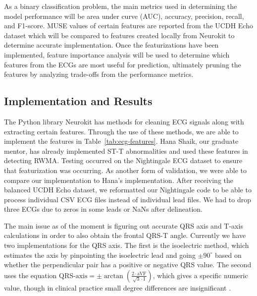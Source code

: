 \documentclass[sigconf,nonacm]{acmart}
\begin{document}
As a binary classification problem, the main metrics used in determining the model performance will be area under curve (AUC), accuracy, precision, recall, and F1-score. MUSE values of certain features are reported from the UCDH Echo dataset which will be compared to features created locally from Neurokit to determine accurate implementation. Once the featurizations have been implemented, feature importance analysis will be used to determine which features from the ECGs are most useful for prediction, ultimately pruning the features by analyzing trade-offs from the performance metrics.

\subsection{Implementation and Results}

The Python library Neurokit has methods for cleaning ECG signals along with extracting certain features. Through the use of these methods, we are able to implement the features in Table~\ref{tab:ecg-features}. Hana Shaik, our graduate mentor, has already implemented ST-T abnormalities and used these features in detecting RWMA. Testing occurred on the Nightingale ECG dataset to ensure that featurization was occurring. As another form of validation, we were able to compare our implementation to Hana's implementation. After receiving the balanced UCDH Echo dataset, we reformatted our Nightingale code to be able to process individual CSV ECG files instead of individual lead files. We had to drop three ECGs due to zeros in some leads or NaNs after delineation.

The main issue as of the moment is figuring out accurate QRS axis and T-axis calculations in order to also obtain the frontal QRS-T angle. Currently we have two implementations for the QRS axis. The first is the isoelectric method, which estimates the axis by pinpointing the isoelectric lead and going $\pm 90^{\circ}$ based on whether the perpendicular pair has a positive or negative QRS value. The second uses the equation $\text{QRS-axis} = \pm \arctan\!\left(\frac{2 \cdot \text{aVF}}{\sqrt{3} \cdot \text{I}}\right)$, which gives a specific numeric value, though in clinical practice small degree differences are insignificant \cite{scherer_abnormal_2009}.
\end{document}
